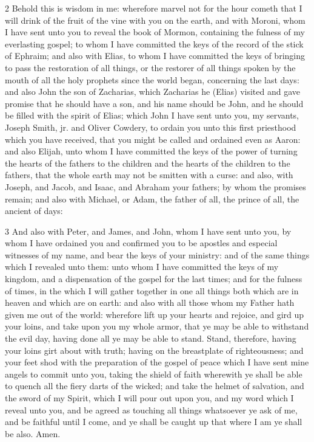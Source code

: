 				2 Behold this is wisdom in me: wherefore marvel not for the hour cometh that I will drink of the fruit of the vine with you on the earth, and with Moroni, whom I have sent unto you to reveal the book of Mormon, containing the fulness of my everlasting gospel; to whom I have committed the keys of the record of the stick of Ephraim; and also with Elias, to whom I have committed the keys of bringing to pass the restoration of all things, or the restorer of all things spoken by the mouth of all the holy prophets since the world began, concerning the last days: and also John the son of Zacharias, which Zacharias he (Elias) visited and gave promise that he should have a son, and his name should be John, and he should be filled with the spirit of Elias; which John I have sent unto you, my servants, Joseph Smith, jr. and Oliver Cowdery, to ordain you unto this first priesthood which you have received, that you might be called and ordained even as Aaron: and also Elijah, unto whom I have committed the keys of the power of turning the hearts of the fathers to the children and the hearts of the children to the fathers, that the whole earth may not be smitten with a curse: and also, with Joseph, and Jacob, and Isaac, and Abraham your fathers; by whom the promises remain; and also with Michael, or Adam, the father of all, the prince of all, the ancient of days:

				3 And also with Peter, and James, and John, whom I have sent unto you, by whom I have ordained you and confirmed you to be apostles and especial witnesses of my name, and bear the keys of your ministry: and of the same things which I revealed unto them: unto whom I have committed the keys of my kingdom, and a dispensation of the gospel for the last times; and for the fulness of times, in the which I will gather together in one all things both which are in heaven and which are on earth: and also with all those whom my Father hath given me out of the world: wherefore lift up your hearts and rejoice, and gird up your loins, and take upon you my whole armor, that ye may be able to withstand the evil day, having done all ye may be able to stand. Stand, therefore, having your loins girt about with truth; having on the breastplate of righteousness; and your feet shod with the preparation of the gospel of peace which I have sent mine angels to commit unto you, taking the shield of faith wherewith ye shall be able to quench all the fiery darts of the wicked; and take the helmet of salvation, and the sword of my Spirit, which I will pour out upon you, and my word which I reveal unto you, and be agreed as touching all things whatsoever ye ask of me, and be faithful until I come, and ye shall be caught up that where I am ye shall be also. Amen.
				
